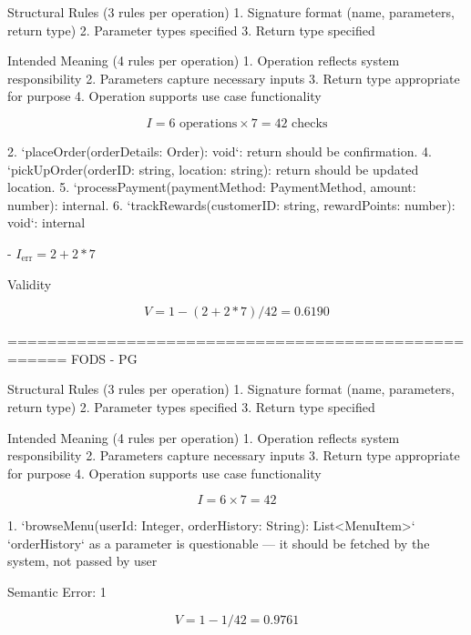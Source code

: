 Structural Rules (3 rules per operation)
1. Signature format (name, parameters, return type)
2. Parameter types specified
3. Return type specified

Intended Meaning (4 rules per operation)
1. Operation reflects system responsibility
2. Parameters capture necessary inputs
3. Return type appropriate for purpose
4. Operation supports use case functionality

\[
I = 6 \text{ operations} \times 7 = 42 \text{ checks}
\]

2. `placeOrder(orderDetails: Order): void`: return should be confirmation. 
4. `pickUpOrder(orderID: string, location: string): return should be updated location. 
5. `processPayment(paymentMethod: PaymentMethod, amount: number): internal. 
6. `trackRewards(customerID: string, rewardPoints: number): void`: internal

- \( I_{\text{err}} = 2 + 2*7 \)


Validity

\[
V = 1 - (2+2*7)/42 = 0.6190
\]

====================================================
FODS - PG

Structural Rules (3 rules per operation)
1. Signature format (name, parameters, return type)
2. Parameter types specified
3. Return type specified

Intended Meaning (4 rules per operation)
1. Operation reflects system responsibility
2. Parameters capture necessary inputs
3. Return type appropriate for purpose
4. Operation supports use case functionality

\[
I = 6 \times 7 = 42
\]

1. `browseMenu(userId: Integer, orderHistory: String): List<MenuItem>`
`orderHistory` as a parameter is questionable — it should be fetched by the system, not passed by user

Semantic Error: 1

\[
V = 1 - 1/42 = 0.9761
\]
